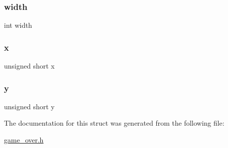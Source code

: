 \subsubsection{\texorpdfstring{width}{width}}
{\footnotesize\ttfamily int width}

\hypertarget{structimage_a6762fe907d546b988585b308b1c304c2}{}\label{structimage_a6762fe907d546b988585b308b1c304c2} 
\subsubsection{\texorpdfstring{x}{x}}
{\footnotesize\ttfamily unsigned short x}

\hypertarget{structimage_a8c9c5ccb800d748c485dfe2b6fa2cd9e}{}\label{structimage_a8c9c5ccb800d748c485dfe2b6fa2cd9e} 
\subsubsection{\texorpdfstring{y}{y}}
{\footnotesize\ttfamily unsigned short y}



The documentation for this struct was generated from the following file\+:\begin{DoxyCompactItemize}
\item 
\hyperlink{game__over_8h}{game\+\_\+over.\+h}\end{DoxyCompactItemize}
